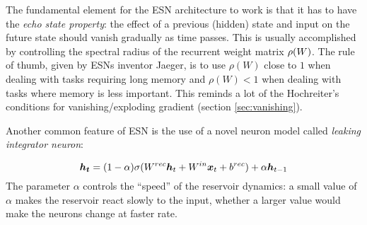 The fundamental element for the ESN architecture to work is that it has to have the \textit{echo state property}: the effect of a previous (hidden) state and input on the future state should vanish gradually as time passes.
This is usually accomplished by controlling the spectral radius of the recurrent weight matrix $\rho(W)$.
The rule of thumb, given by ESNs inventor Jaeger, is to use $\rho(W)$ close to $1$ when dealing with tasks requiring 
long memory and $\rho(W)<1$ when dealing with tasks where memory is less important.
This reminds a lot of the 
Hochreiter's conditions for vanishing/exploding gradient (section \ref{sec:vanishing}).


Another common feature of ESN is the use of a novel neuron model called \textit{leaking integrator neuron}:

\begin{equation}
 \boldsymbol{h_t} = (1-\alpha) \sigma(W^{rec}\boldsymbol{h}_t + W^{in}\boldsymbol{x}_t + b^{rec}) +\alpha \boldsymbol{h}_{t-1}
\end{equation}
 The parameter $\alpha$ controls the ``speed'' of the reservoir dynamics: a small value of $\alpha$ makes the reservoir 
react slowly to the input, whether a larger value would make the neurons change at faster rate.
